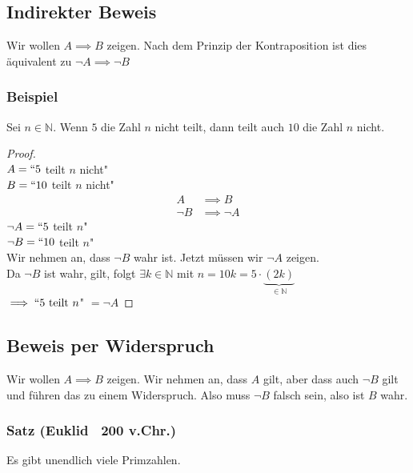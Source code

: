 \documentclass{article}
\begin{document}
  \subsection{Indirekter Beweis}
    Wir wollen $A \implies B$ zeigen. Nach dem Prinzip der Kontraposition ist
    dies äquivalent zu $\neg A \implies \neg B$

    \subsubsection{Beispiel}
      Sei $n \in \mathbb{N}$. Wenn $5$ die Zahl $n$ nicht teilt, dann teilt auch
      $10$ die Zahl $n$ nicht.
      \begin{proof} \mbox{} \\
        $A = ``5$ teilt $n$ nicht" \\
        $B = ``10$ teilt $n$ nicht"
        \begin{align*}
          A &\implies B \\
          \neg B &\implies \neg A
        \end{align*}
        $\neg A = `` 5$ teilt $n$" \\
        $\neg B = `` 10$ teilt $n$" \\
        Wir nehmen an, dass $\neg B$ wahr ist. Jetzt müssen wir $\neg A$ zeigen. \\
        Da $\neg B$ ist wahr, gilt, folgt $\exists k \in \mathbb{N}$
        mit $n=10k = 5 \cdot \underbrace{(2k)}_{\in \mathbb{N}}$ \\
        $\implies ``5 \text{ teilt } n$" $ = \neg A$
      \end{proof}

  \subsection{Beweis per Widerspruch}
    Wir wollen $A \implies B$ zeigen. Wir nehmen an, dass $A$ gilt, aber dass auch
    $\neg B$ gilt und führen das zu einem Widerspruch. Also muss $\neg B$ falsch
    sein, also ist $B$ wahr.

    \subsubsection{Satz (Euklid ~200 v.Chr.)}
      Es gibt unendlich viele Primzahlen.
\end{document}
